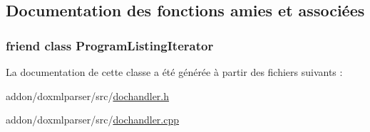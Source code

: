 \subsection{Documentation des fonctions amies et associées}
\hypertarget{class_program_listing_handler_adfce73bc0c8b947eb07bee0086e3c2c3}{}
\subsubsection[{Program\+Listing\+Iterator}]{\setlength{\rightskip}{0pt plus 5cm}friend class {\bf Program\+Listing\+Iterator}\hspace{0.3cm}{\ttfamily [friend]}}\label{class_program_listing_handler_adfce73bc0c8b947eb07bee0086e3c2c3}


La documentation de cette classe a été générée à partir des fichiers suivants \+:\begin{DoxyCompactItemize}
\item 
addon/doxmlparser/src/\hyperlink{dochandler_8h}{dochandler.\+h}\item 
addon/doxmlparser/src/\hyperlink{dochandler_8cpp}{dochandler.\+cpp}\end{DoxyCompactItemize}
